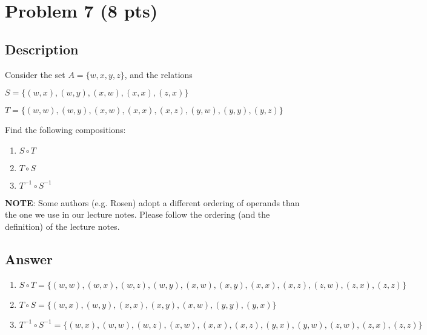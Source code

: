 \newpage

\section{Problem 7 (8 pts)}
\subsection{Description}

Consider the set $A = \{ w, x, y, z \}$, and the relations

\begin{description}

\item $S = \{ (w, x), (w, y), (x, w), (x, x), (z, x) \}$

\item $T = \{ (w, w), (w, y), (x, w), (x, x),  (x, z), (y, w), (y, y), (y, z) \}$
\end{description}

\noindent Find the following compositions:

\begin{enumerate}
\item $S \circ T$

\item $T \circ S$

\item $T^{-1} \circ S^{-1}$
\end{enumerate}

\noindent \textbf{NOTE}: Some authors (e.g. Rosen) adopt a different ordering of operands than the one we use in our lecture notes. Please follow the ordering (and the definition) of the lecture notes.\\

\subsection{Answer}

\begin{enumerate}
    \item $S \circ T = \{ (w, w), (w, x), (w, z), (w, y), (x, w), (x, y), (x, x), (x, z),(z, w), (z, x), (z, z) \}$
    
    \item $T \circ S = \{ (w, x), (w, y), (x, x), (x, y), (x, w), (y, y), (y, x)  \}$
    
    \item $T^{-1} \circ S^{-1} = \{ (w, x), (w, w), (w, z), (x, w), (x, x), (x, z), (y, x),(y, w), (z, w), (z, x), (z, z) \}$
\end{enumerate}
